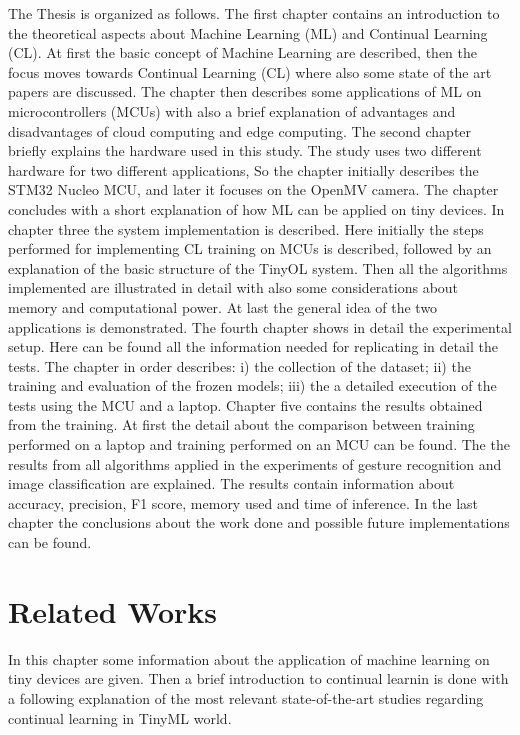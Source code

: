\documentclass[12pt]{report}
\begin{document}
The Thesis is organized as follows. The first chapter contains an introduction to the theoretical aspects about Machine Learning (ML) and Continual Learning (CL). At first the basic concept of Machine Learning are described, then the focus moves towards Continual Learning (CL) where also some state of the art papers are discussed. The chapter then describes some applications of ML on microcontrollers (MCUs) with also a brief explanation of advantages and disadvantages of cloud computing and edge computing. The second chapter briefly explains the hardware used in this study. The study uses two different hardware for two different applications, So the chapter initially describes the STM32 Nucleo MCU, and later it focuses on the OpenMV camera. The chapter concludes with a short explanation of how ML can be applied on tiny devices. In chapter three the system implementation is described. Here initially the steps performed for implementing CL training on MCUs is described, followed by an explanation of the basic structure of the TinyOL system. Then all the algorithms implemented are illustrated in detail with also some considerations about memory and computational power. At last the general idea of the two applications is demonstrated. The fourth chapter shows in detail the experimental setup. Here can be found all the information needed for replicating in detail the tests. The chapter in order describes: i) the collection of the dataset; ii) the training and evaluation of the frozen models; iii) the a detailed execution of the tests using the MCU and a laptop. Chapter five contains the results obtained from the training. At first the detail about the comparison between training performed on a laptop and training performed on an MCU can be found. The the results from all algorithms applied in the experiments of gesture recognition and image classification are explained. The results contain information about accuracy, precision, F1 score, memory used and time of inference. In the last chapter the conclusions about the work done and possible future implementations can be found.


\chapter{Related Works}
\label{relworks}

In this chapter some information about the application of machine learning on tiny devices are given. Then a brief introduction to continual learnin is done with a following explanation of the most relevant state-of-the-art studies regarding continual learning in TinyML world. 
\end{document}
